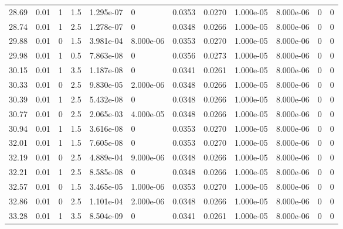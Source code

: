 \documentclass[preview]{standalone}
\begin{document}
{{{\begin{tabular}{L{1.2cm}C{1.2cm} C{0.3cm}C{0.5cm} C{1.4cm}C{1.4cm} C{1.4cm}C{1.4cm} C{1.6cm}C{1.6cm} C{1.6cm}C{1.6cm}}
  28.69  &  0.01  & 1     & 1.5 &  1.295e-07  & 0  &  0.0353&   0.0270& 1.000e-05 & 8.000e-06   &  0 & 0  \\ 
  28.74  &  0.01  & 1     & 2.5 &  1.278e-07  & 0  &  0.0348&   0.0266& 1.000e-05 & 8.000e-06   &  0 & 0  \\ 
  29.88  &  0.01  & 0     & 1.5 &  3.981e-04  & 8.000e-06  &  0.0353&   0.0270& 1.000e-05 & 8.000e-06   &  0 & 0  \\ 
  29.98  &  0.01  & 1     & 0.5 &  7.863e-08  & 0  &  0.0356&   0.0273& 1.000e-05 & 8.000e-06   &  0 & 0  \\ 
  30.15  &  0.01  & 1     & 3.5 &  1.187e-08  & 0  &  0.0341&   0.0261& 1.000e-05 & 8.000e-06   &  0 & 0  \\ 
  30.33  &  0.01  & 0     & 2.5 &  9.830e-05  & 2.000e-06  &  0.0348&   0.0266& 1.000e-05 & 8.000e-06   &  0 & 0  \\ 
  30.39  &  0.01  & 1     & 2.5 &  5.432e-08  & 0  &  0.0348&   0.0266& 1.000e-05 & 8.000e-06   &  0 & 0  \\ 
  30.77  &  0.01  & 0     & 2.5 &  2.065e-03  & 4.000e-05  &  0.0348&   0.0266& 1.000e-05 & 8.000e-06   &  0 & 0  \\ 
  30.94  &  0.01  & 1     & 1.5 &  3.616e-08  & 0  &  0.0353&   0.0270& 1.000e-05 & 8.000e-06   &  0 & 0  \\ 
  32.01  &  0.01  & 1     & 1.5 &  7.605e-08  & 0  &  0.0353&   0.0270& 1.000e-05 & 8.000e-06   &  0 & 0  \\ 
  32.19  &  0.01  & 0     & 2.5 &  4.889e-04  & 9.000e-06  &  0.0348&   0.0266& 1.000e-05 & 8.000e-06   &  0 & 0  \\ 
  32.21  &  0.01  & 1     & 2.5 &  8.585e-08  & 0  &  0.0348&   0.0266& 1.000e-05 & 8.000e-06   &  0 & 0  \\ 
  32.57  &  0.01  & 0     & 1.5 &  3.465e-05  & 1.000e-06  &  0.0353&   0.0270& 1.000e-05 & 8.000e-06   &  0 & 0  \\ 
  32.86  &  0.01  & 0     & 2.5 &  1.101e-04  & 2.000e-06  &  0.0348&   0.0266& 1.000e-05 & 8.000e-06   &  0 & 0  \\ 
  33.28  &  0.01  & 1     & 3.5 &  8.504e-09  & 0  &  0.0341&   0.0261& 1.000e-05 & 8.000e-06   &  0 & 0  \\ 
\hline 
\end{tabular} 

}}}
\end{document}
